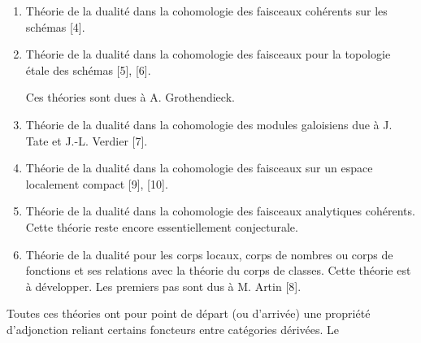 \begin{enumerate}
\renewcommand{\labelenumi}{\arabic{enumi})}
\item Théorie de la dualité dans la cohomologie des faisceaux cohérents sur
les schémas [4].

\item Théorie de la dualité dans la cohomologie des faisceaux pour la
topologie étale des schémas [5], [6].

Ces théories sont dues à A. Grothendieck.

\item Théorie de la dualité dans la cohomologie des modules galoisiens due à
J. Tate et J.-L. Verdier [7].

\item Théorie de la dualité dans la cohomologie des faisceaux sur un espace
localement compact [9], [10].

\item Théorie de la dualité dans la cohomologie des faisceaux analytiques
cohérents. Cette théorie reste encore essentiellement conjecturale.

\item Théorie de la dualité pour les corps locaux, corps de nombres ou corps
de fonctions et ses relations avec la théorie du corps de classes. Cette
théorie est à développer. Les premiers pas sont dus à M. Artin [8].
\end{enumerate}

Toutes ces théories ont pour point de départ (ou d'arrivée) une propriété
d'adjonction reliant certains foncteurs entre catégories dérivées. Le

